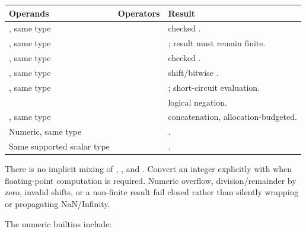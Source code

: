 \begin{center}
\begin{tabularx}{\textwidth}{@{}l l Y@{}}
\toprule
\textbf{Operands} & \textbf{Operators} & \textbf{Result} \\
\midrule
{}, same type & \code{+ - * / \%} & checked . \\
, same type & \code{+ - * / \%} & ; result must remain finite. \\
, same type & \code{+ - * / \%} & checked . \\
, same type & \code{<< >> \& \^{} |} & shift/bitwise . \\
, same type & \code{\&\& ||} & ; short-circuit evaluation. \\
 & \code{!} & logical negation. \\
, same type & \code{+} &  concatenation, allocation-budgeted. \\
Numeric, same type & \code{< <= > >=} & . \\
Same supported scalar type & \code{== !=} & . \\
\bottomrule
\end{tabularx}
\end{center}

There is no implicit mixing of , , and . Convert an integer explicitly with  when floating-point computation is required. Numeric overflow, division/remainder by zero, invalid shifts, or a non-finite  result fail closed rather than silently wrapping or propagating NaN/Infinity.

The numeric builtins include:

